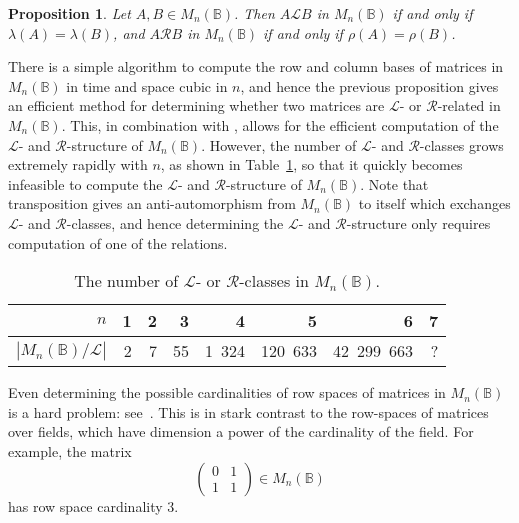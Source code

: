 \documentclass[11pt]{article}
\newtheorem{prop}[thm]{Proposition}
\numberwithin{equation}{section}
\newcommand{\B}{\mathbb{B}}
\newcommand{\Bn}{M_n(\B)}
\renewcommand{\L}{\mathscr{L}}
\newcommand{\R}{\mathscr{R}}
\newcommand{\mat}[4]{\begin{pmatrix}#1&#2\\#3&#4\end{pmatrix}}
\newcommand{\RowB}{\lambda}
\newcommand{\ColB}{\rho}
\begin{document}
\begin{prop} 
  Let $A, B \in \Bn$. Then $A \L B$ in $\Bn$ if and only if $\RowB(A) =
  \RowB(B)$, and $A \R B$ in $\Bn$ if and only if $\ColB(A) = \ColB(B)$.
\end{prop}
There is a simple algorithm to compute the row and column bases of matrices in
$\Bn$ in time and space cubic in $n$, and hence the previous proposition gives
an efficient method for determining whether two matrices are $\L$- or
$\R$-related in $\Bn$. This, in combination with
, allows for the efficient computation of the
$\L$- and $\R$-structure of $\Bn$. However, the number of $\L$- and $\R$-classes
grows extremely rapidly with $n$, as shown in Table~\ref{tab:NumberLRClasses},
so that it quickly becomes infeasible to compute the $\L$- and $\R$-structure of
$\Bn$. Note that transposition gives an anti-automorphism from $\Bn$ to itself
which exchanges $\L$- and $\R$-classes, and hence determining the $\L$- and
$\R$-structure only requires computation of one of the relations.

\begin{table}
  \centering
  \begin{tabular}{r|r|r|r|r|r|r|r}
    $n$ & 1 & 2 & 3 & 4 & 5 & 6 & 7 \\
    \hline
    $|\Bn / \L|$ & 2 & 7 & 55 & 1\ 324& 120\ 633& 42\ 299\ 663& ?
  \end{tabular}
\vspace{1cm}

\caption{The number of $\L$- or $\R$-classes in $\Bn$.} 
  \label{tab:NumberLRClasses}
\end{table}

Even determining the possible cardinalities of row spaces of matrices in $\Bn$
is a hard problem: see~\cite{Breen2001aa, Konieczny1992aa, Li1995aa,
  Shaofang1998aa, Zivkovic2006aa}. This is in stark contrast to the row-spaces
of matrices over fields, which have dimension a power of the cardinality of the
field. For example, the matrix \[\mat{0}{1}{1}{1} \in \Bn\] has row space
cardinality $3$.
\end{document}

